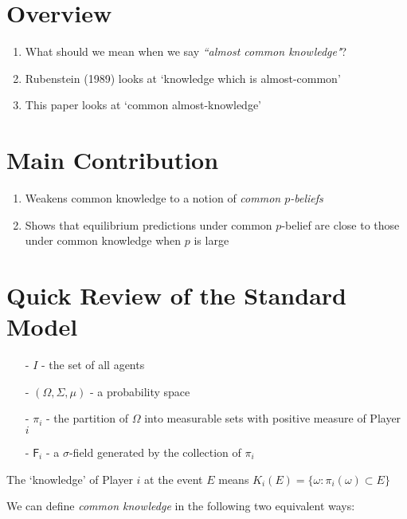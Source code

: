  {}

\section*{Overview}
\begin{enumerate}
	\item What should we mean when we say \textit{``almost common knowledge"}?
	\item Rubenstein (1989) looks at `knowledge which is almost-common'
	\item This paper looks at `common almost-knowledge'
\end{enumerate}

\section*{Main Contribution}
\begin{enumerate}
	\item Weakens common knowledge to a notion of \textit{common $\mathit{p}$-beliefs}
	\item Shows that equilibrium predictions under common $p$-belief are close to those under common knowledge when $p$ is large
\end{enumerate}

\section*{Quick Review of the Standard Model}
\begin{enumerate}
	\item[-] $I$ - the set of all agents
	\item[-] $(\Omega,\Sigma,\mu)$ - a probability space
	\item[-] $\pi_i$ - the partition of $\Omega$ into measurable sets with positive measure of Player $i$
	\item[-] $\mathsf{F}_i$ - a $\sigma$-field generated by the collection of $\pi_i$
	
\end{enumerate}
The `knowledge' of Player $i$ at the event $E$ means $K_i(E)=\{\omega : \pi_i(\omega)\subset E\}$

We can define \textit{common knowledge} in the following two equivalent ways:


